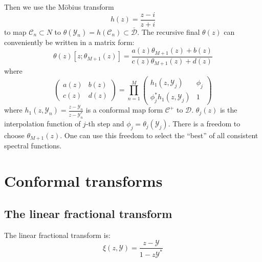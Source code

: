 \documentclass[
	preprint,%
	aps,
	prb,
	showpacs,	
	amsmath, amssymb]{revtex4-2}
\DeclareRobustCommand{\+}{\hstretch{1.25} {\boldsymbol {\mathrel{+}}}}
\newcommand{\Y}{ {\mathcal{Y}} }
\newcommand{\C}{ {\mathcal{C}} }
\newcommand{\D}{ {\mathcal{D}} }
\newcommand{\Dbar}{ {\bar{\mathcal{D}}} }
\begin{document}
Then we use the Möbius transform
\begin{equation}\label{eq:Mobius-transform}
	h(z) = \frac{z - i}{z + i}
\end{equation}
to map $\C_n \subset N$ to 
$\theta(\Y_n) = h(\C_n) \subset \Dbar$. 
The recursive final $\theta(z)$ can conveniently be written in a
matrix form:
\begin{equation}\label{eq:recursive-theta}
	\theta(z)[z;\theta_{M+1}(z)] 
		= \frac{a(z)\theta_{M+1}(z) + b(z)}{c(z)\theta_{M+1}(z) + d(z)}
\end{equation}
where
\begin{equation}\label{eq:factor-matrix}
	\left(
		\begin{matrix}
			a(z) & b(z) \\
			c(z) & d(z)
		\end{matrix}
	\right) = \prod_{n=1}^M
	\left(
		\begin{matrix}
			h_1(z, \Y_j) & \phi_j \\
			\phi_j^* h_1(z, \Y_j) & 1
		\end{matrix}
	\right)
\end{equation}
where $h_1(z, \Y_n) = \frac{z - \Y_n}{z -\Y_n^*}$ 
is a conformal map form $\C^+$ to $\D$. $\theta_j(z)$ is 
the interpolation function of $j$-th step and
$\phi_j = \theta_j(\Y_j)$. There is a freedom to choose $\theta_{M+1}(z)$.
One can use this freedom to select the “best” of all consistent spectral functions.




\appendix
\section{Conformal transforms}
\label{app:conformal-transforms}

\subsection{The linear fractional transform}
\label{appsub:linear-fractional-transform}
The linear fractional transform is:
\begin{equation}\label{eq:linear-fractional-transform}
	\xi(z, \Y) = \frac{z - \Y}{1 - z\Y^*}
\end{equation}
\end{document}
